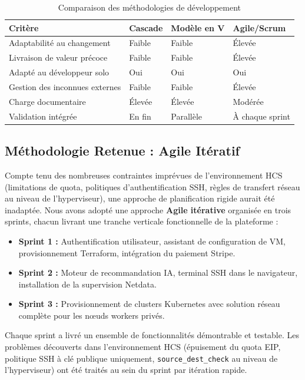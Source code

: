 \begin{table}[H]
\centering
\caption{Comparaison des méthodologies de développement}
\label{tab:methodologies}
\begin{tabularx}{\linewidth}{lXXX}
\toprule
\textbf{Critère}               & \textbf{Cascade} & \textbf{Modèle en V} & \textbf{Agile/Scrum} \\
\midrule
Adaptabilité au changement     & Faible   & Faible   & Élevée \\
Livraison de valeur précoce    & Faible   & Faible   & Élevée \\
Adapté au développeur solo     & Oui      & Oui      & Oui \\
Gestion des inconnues externes & Faible   & Faible   & Élevée \\
Charge documentaire            & Élevée   & Élevée   & Modérée \\
Validation intégrée            & En fin   & Parallèle & À chaque sprint \\
\bottomrule
\end{tabularx}
\end{table}

\subsection{Méthodologie Retenue : Agile Itératif}

Compte tenu des nombreuses contraintes imprévues de l'environnement HCS (limitations
de quota, politiques d'authentification SSH, règles de transfert réseau au niveau de
l'hyperviseur), une approche de planification rigide aurait été inadaptée. Nous avons
adopté une approche \textbf{Agile itérative} organisée en trois sprints, chacun livrant
une tranche verticale fonctionnelle de la plateforme :

\begin{itemize}
  \item \textbf{Sprint 1 :} Authentification utilisateur, assistant de configuration
        de VM, provisionnement Terraform, intégration du paiement Stripe.
  \item \textbf{Sprint 2 :} Moteur de recommandation IA, terminal SSH dans le
        navigateur, installation de la supervision Netdata.
  \item \textbf{Sprint 3 :} Provisionnement de clusters Kubernetes avec solution
        réseau complète pour les nœuds workers privés.
\end{itemize}

Chaque sprint a livré un ensemble de fonctionnalités démontrable et testable. Les
problèmes découverts dans l'environnement HCS (épuisement du quota EIP, politique SSH
à clé publique uniquement, \texttt{source\_dest\_check} au niveau de l'hyperviseur)
ont été traités au sein du sprint par itération rapide.

